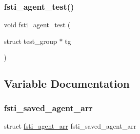 \subsubsection{\texorpdfstring{fsti\+\_\+agent\+\_\+test()}{fsti\_agent\_test()}}
{\footnotesize\ttfamily void fsti\+\_\+agent\+\_\+test (\begin{DoxyParamCaption}\item[{struct test\+\_\+group $\ast$}]{tg }\end{DoxyParamCaption})}



\subsection{Variable Documentation}
\mbox{\label{fsti-agent_8h_a0d0890f5771bd3efa056881d37f4c6b9}} 
\subsubsection{\texorpdfstring{fsti\+\_\+saved\+\_\+agent\+\_\+arr}{fsti\_saved\_agent\_arr}}
{\footnotesize\ttfamily struct \mbox{\hyperlink{structfsti__agent__arr}{fsti\+\_\+agent\+\_\+arr}} fsti\+\_\+saved\+\_\+agent\+\_\+arr}

